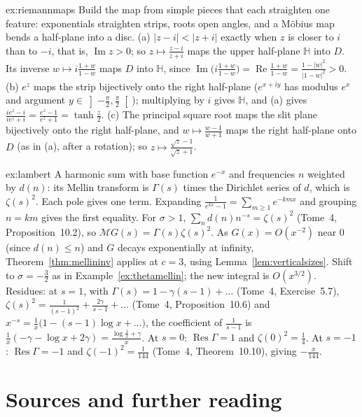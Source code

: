 \begin{solution}{ex:riemannmaps}
\idea Build the map from simple pieces that each straighten one feature: exponentials straighten strips, roots open angles, and a M\"obius map bends a half-plane into a disc.
\writeup (a) $|z-i|<|z+i|$ exactly when $z$ is closer to $i$ than to $-i$, that is, $\operatorname{Im}z>0$; so $z\mapsto\frac{z-i}{z+i}$ maps the upper half-plane $\mathbb H$ into $D$. Its inverse $w\mapsto i\frac{1+w}{1-w}$
maps $D$ into $\mathbb H$, since $\operatorname{Im}\bigl(i\frac{1+w}{1-w}\bigr)=\operatorname{Re}\frac{1+w}{1-w}=\frac{1-|w|^2}{|1-w|^2}>0$. (b) $e^z$ maps the strip bijectively onto the right half-plane ($e^{x+iy}$ has modulus $e^x$ and argument
$y\in\left]-\frac\pi2,\frac\pi2\right[$); multiplying by $i$ gives $\mathbb H$, and (a) gives $\frac{ie^z-i}{ie^z+i}=\frac{e^z-1}{e^z+1}=\tanh\frac z2$. (c) The principal square root maps the slit plane bijectively onto the right
half-plane, and $w\mapsto\frac{w-1}{w+1}$ maps the right half-plane onto $D$ (as in (a), after a rotation); so $z\mapsto\frac{\sqrt z-1}{\sqrt z+1}$.
\end{solution}

\begin{solution}{ex:lambert}
\idea A harmonic sum with base function $e^{-x}$ and frequencies $n$ weighted by $d(n)$: its Mellin transform is $\Gamma(s)$ times the Dirichlet series of $d$, which is $\zeta(s)^2$. Each pole gives one term.
\writeup Expanding $\frac1{e^{kx}-1}=\sum_{m\ge1}e^{-kmx}$ and grouping $n=km$ gives the first equality. For $\sigma>1$, $\sum_nd(n)n^{-s}=\zeta(s)^2$ (Tome~4, Proposition~10.2), so $\mathcal MG(s)=\Gamma(s)\zeta(s)^2$. As
$G(x)=O(x^{-2})$ near $0$ (since $d(n)\le n$) and $G$ decays exponentially at infinity, Theorem~\ref{thm:mellininv} applies at $c=3$, using Lemma~\ref{lem:verticalsizes}. Shift to $\sigma=-\frac32$ as in
Example~\ref{ex:thetamellin}; the new integral is $O(x^{3/2})$. Residues: at $s=1$, with $\Gamma(s)=1-\gamma(s-1)+\dots$ (Tome~4, Exercise~5.7), $\zeta(s)^2=\frac1{(s-1)^2}+\frac{2\gamma}{s-1}+\dots$ (Tome~4,
Proposition~10.6) and $x^{-s}=\frac1x\bigl(1-(s-1)\log x+\dots\bigr)$, the coefficient of $\frac1{s-1}$ is $\frac1x(-\gamma-\log x+2\gamma)=\frac{\log\frac1x+\gamma}x$. At $s=0$: $\operatorname{Res}\Gamma=1$ and $\zeta(0)^2=\frac14$. At $s=-1$:
$\operatorname{Res}\Gamma=-1$ and $\zeta(-1)^2=\frac1{144}$ (Tome~4, Theorem~10.10), giving $-\frac x{144}$.
\end{solution}

\section*{Sources and further reading}

